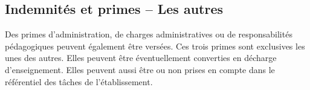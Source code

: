  

 




\subsection{Indemnit\'es et primes -- Les autres}

Des primes d'administration, de charges administratives ou de
responsabilit\'es p\'edagogiques peuvent \'egalement \^etre
vers\'ees. Ces trois primes sont exclusives les unes des autres.
Elles peuvent \^etre \'even\-tuel\-lement converties en d\'echarge d'enseignement. Elles peuvent
aussi \^etre ou non prises en compte dans le r\'ef\'erentiel des t\^aches de l'\'etablissement.

